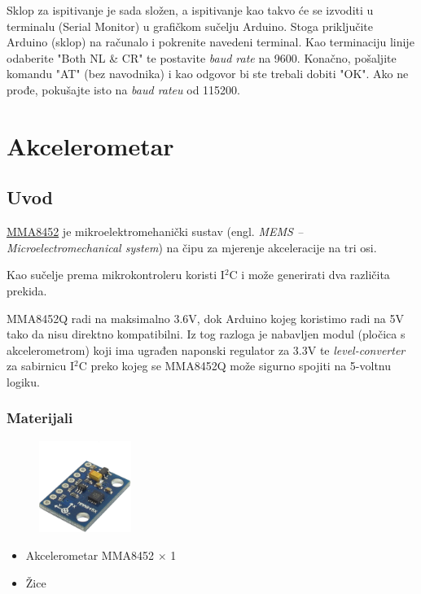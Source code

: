 \documentclass[times, utf8, zavrsni, numeric, sort]{fer}
\begin{document}
Sklop za ispitivanje je sada složen, a ispitivanje kao takvo će se izvoditi u terminalu (Serial Monitor) u grafičkom sučelju Arduino. Stoga priključite Arduino (sklop) na računalo i pokrenite navedeni terminal. Kao terminaciju linije odaberite "Both NL \& CR" te postavite \textit{baud rate} na 9600. Konačno, pošaljite komandu "AT" (bez navodnika) i kao odgovor bi ste trebali dobiti "OK". Ako ne prođe, pokušajte isto na \textit{baud rateu} od 115200.


\chapter{Akcelerometar}
\section{Uvod}

\href{http://www.nxp.com/files/sensors/doc/data_sheet/MMA8452Q.pdf}{MMA8452} je mikroelektromehanički sustav (engl. \textit{MEMS -- Microelectromechanical system}) na čipu za mjerenje akceleracije na tri osi.

Kao sučelje prema mikrokontroleru koristi I$^2$C i može generirati dva različita prekida.

MMA8452Q radi na maksimalno 3.6V, dok Arduino kojeg koristimo radi na 5V tako da nisu direktno kompatibilni. Iz tog razloga je nabavljen modul (pločica s akcelerometrom) koji ima ugrađen naponski regulator za 3.3V te \textit{level-converter} za sabirnicu I$^2$C preko kojeg se MMA8452Q može sigurno spojiti na 5-voltnu logiku.

\subsection{Materijali}
\begin{figure}[h!]
	\centering
	\includegraphics[width=3cm]{./Fotke/MMA8452/Materijal.jpg}
	\label{fig:slika1}
\end{figure}

\begin{itemize}
	\setlength{\itemsep}{0pt}
	\setlength{\parskip}{0pt}
	
	\item Akcelerometar MMA8452 $\times$ 1
	\item Žice
\end{itemize}
\end{document}
